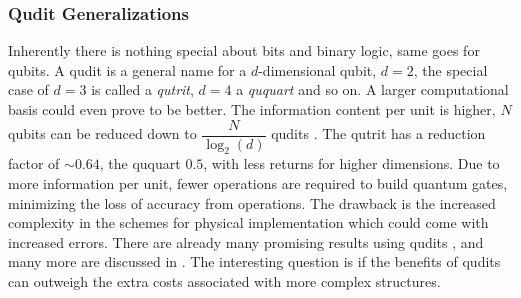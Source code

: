 \subsubsection{Qudit Generalizations}
Inherently there is nothing special about bits and binary logic, same goes for qubits.  A qudit is a general name for a  $d$-dimensional qubit, $d = 2$, the special case of $d = 3$ is called a \textit{qutrit}, $d = 4$ a \textit{ququart} and so on. A larger computational basis could even prove to be better. The information content per unit is higher, $N$ qubits can be reduced down to $\dfrac{N}{\log_2(d)}$ qudits \cite{info_qudit}. The qutrit has a reduction factor of $\sim 0.64$, the ququart $0.5$, with less returns for higher dimensions. Due to more information per unit, fewer operations are required to build quantum gates, minimizing the loss of accuracy from operations. The drawback is the increased complexity in the schemes for physical implementation which could come with increased errors. There are already many promising results using qudits \cite{qutrit1,qudit2,qudit3}, and many more are discussed in \cite{qudit}. The interesting question is if the benefits of qudits can outweigh the extra costs associated with more complex structures.

